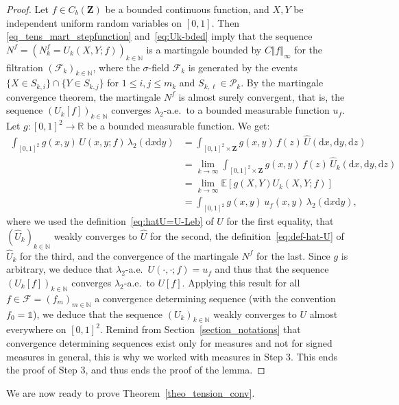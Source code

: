 \documentclass{amsart}
\newcommand{\aE}{a.e.\ }
\theoremstyle{plain}
\theoremstyle{definition}
\newcommand{\Space}{\mathbf{Z}}
\newcommand{\cf}{\mathcal{F}}
\newcommand{\cp}{\mathcal{P}}
\newcommand{\CbFunct}{C_b(\Space)}
\newcommand{\F}{\mathcal{F}}
\newcommand{\E}{\mathbb{E}}
\newcommand{\un}{\mathds{1}}
\newcommand{\N}{\mathbb{N}}
\newcommand{\R}{\mathbb{R}}
\newcommand{\rd}{\mathrm{d}}
\newcommand{\norm}[1]{\Vert#1\Vert}
\begin{document}
\begin{proof}
Let  $f\in \CbFunct$  be a  bounded  continuous function,  and $X,Y$  be
independent    uniform    random     variables    on    $[0,1]$.     Then
\eqref{eq_tens_mart_stepfunction} and~\eqref{eq:Uk-bded} imply
that  the sequence  $N^f=(N_k^f=U_k(X,Y;f) )_{k\in\N}$  is a  
 martingale bounded by $C\norm{f}_{\infty}$  for the filtration $(\cf_k)_{k\in \N}$, 
 where the $\sigma$-field $\cf_k$ is generated  by the events $\{X\in S_{k,i}\}\cap\{Y\in S_{k, j}\}$ 
 for $1\leq  i, j \leq  m_k$ and $S_{k, \ell}\in\cp_k$. 
By the martingale convergence theorem, 
the martingale $N^f$ is almost surely convergent, that is, 
 the sequence $(U_k[f])_{k\in\N}$ converges
 $\lambda_2$-\aE  to a bounded measurable function $u_f$.
Let $g:[0,1]^2\to \R$ be a bounded measurable function.
We get:
\begin{align*}
  \int_{[0, 1]^2} g(x,y)\, U(x,y; f) \,  \lambda_2(\rd x \rd y)
&  =
 \int_{[0, 1]^2\times \Space} g(x,y)\,f(z) \, \hat U(\rd x, \rd y, \rd
 z)\\
&  = \lim_{k\rightarrow \infty }
 \int_{[0, 1]^2\times \Space} g(x,y)\,f(z) \, \hat U_k(\rd x, \rd y, \rd
 z)\\
&  = \lim_{k\rightarrow \infty }
 \E\left[g(X,Y) U_k(X,Y;f) \right]\\
& =\int_{[0, 1]^2} g(x,y)\, u_f(x,y)\, \lambda_2(\rd x \rd y), 
\end{align*}
where we used the definition~\eqref{eq:hatU=U-Leb}  of $U$ for the first
equality, that $(\hat  U_k )_{k\in\N}$ weakly converges  to $\hat U$
for the second, the definition~\eqref{eq:def-hat-U}  of $\hat U_k$ for the
third, and the convergence of the martingale $N^f$ for the last. Since $g$
is arbitrary,  we deduce that $\lambda_2$-\aE  $U(\cdot,\cdot; f)=u_f$
and   thus    that   the    sequence   $(U_k[f])_{k\in\N}$   converges
$\lambda_2$-\aE    to    $U[f]$.     Applying    this    result    for all
$f\in  \F  =  (f_m)_{m\in\N}$ a  convergence  determining  sequence 
(with the convention $f_0=\un$), we deduce
that  the sequence $(U_k )_{k\in\N} $ weakly converges  to $U$ almost
everywhere on $[0, 1]^2$. 
Remind from Section~\ref{section_notations}
that convergence determining sequences exist only for measures
	and not for signed measures in general,
	this is why we worked with measures in Step 3.
This ends the proof of Step 3, and thus ends the proof of the lemma.
\end{proof}

 


We are now ready to prove Theorem~\ref{theo_tension_conv}.
\end{document}
